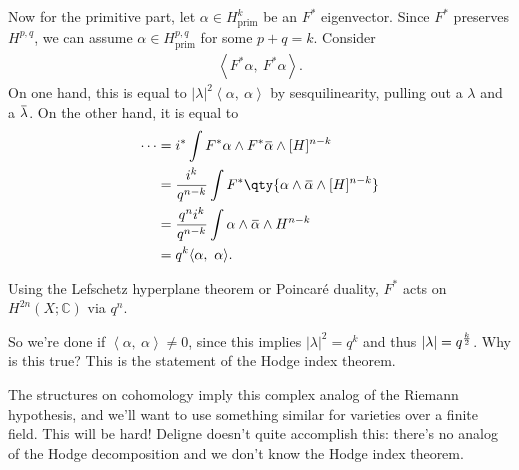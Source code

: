 Now for the primitive part, let
\(\alpha\in H^k_{{\operatorname{prim}}}\) be an \(F^*\) eigenvector.
Since \(F^*\) preserves \(H^{p, q}\), we can assume
\(\alpha \in H^{p, q}_{{\operatorname{prim}}}\) for some \(p+q=k\).
Consider
\begin{align*}  
{\left\langle {F^* \alpha},~{F^*\alpha} \right\rangle}
.\end{align*}
On one hand, this is equal to
\({\left\lvert {\lambda} \right\rvert}^2 {\left\langle {\alpha},~{\alpha} \right\rangle}\)
by sesquilinearity, pulling out a \(\lambda\) and a
\(\mkern 1.5mu\overline{\mkern-1.5mu\lambda\mkern-1.5mu}\mkern 1.5mu\).
On the other hand, it is equal to
\begin{align*}  
\cdots 
&= i^* \int F^* \alpha \wedge F^* \mkern 1.5mu\overline{\mkern-1.5mu\alpha \mkern-1.5mu}\mkern 1.5mu\wedge [H]^{n-k} \\
&= {i^k \over q^{n-k}} \int F^*\qty{\alpha \wedge \mkern 1.5mu\overline{\mkern-1.5mu\alpha \mkern-1.5mu}\mkern 1.5mu\wedge [H]^{n-k} } \\
&= {q^n i^k \over q^{n-k}} \int \alpha \wedge \mkern 1.5mu\overline{\mkern-1.5mu\alpha \mkern-1.5mu}\mkern 1.5mu\wedge H^{n-k} \\
&= q^k {\left\langle {\alpha},~{\alpha} \right\rangle}
.\end{align*}

\begin{exercise}[?]

Using the Lefschetz hyperplane theorem or Poincaré duality, \(F^*\) acts
on \(H^{2n}(X; {\mathbb{C}})\) via \(q^n\).

\end{exercise}

So we're done if
\({\left\langle {\alpha},~{\alpha} \right\rangle} \neq 0\), since this
implies \({\left\lvert {\lambda} \right\rvert}^2 = q^k\) and thus
\({\left\lvert {\lambda } \right\rvert}= q^{k\over 2}\). Why is this
true? This is the statement of the Hodge index theorem.

\begin{remark}[Slogan]

The structures on cohomology imply this complex analog of the Riemann
hypothesis, and we'll want to use something similar for varieties over a
finite field. This will be hard! Deligne doesn't quite accomplish this:
there's no analog of the Hodge decomposition and we don't know the Hodge
index theorem.

\end{remark}

